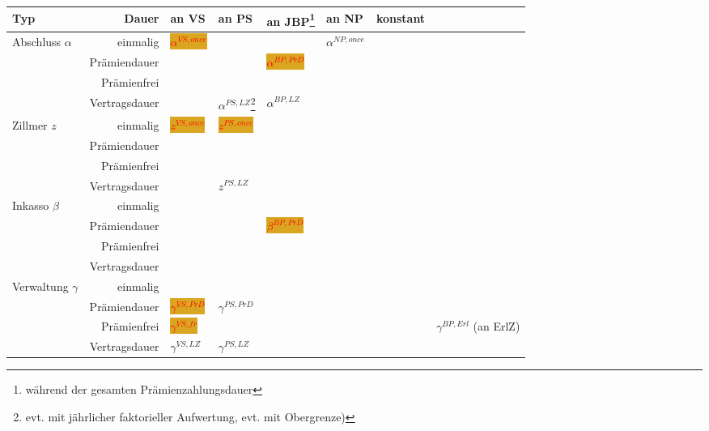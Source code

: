 \documentclass[a4paper,10pt]{article}
\newcommand{\markiert}[1]{{\setlength{\fboxsep}{0pt}\colorbox{Goldenrod}{\textcolor{red}{#1}}}}
\begin{document}
\begin{longtable}{||lr|v{1.5cm}|v{1.5cm}|v{1.5cm}|v{1.5cm}|v{1.5cm}|v{1.5cm}||}\hline\hline
Typ & Dauer & an VS & an PS & an JBP\footnote{während der gesamten Prämienzahlungsdauer} & an NP & konstant & \\ \hline


Abschluss $\alpha$ & einmalig      & \markiert{$\alpha^{VS,once}$} &                                                                                                    &                            & $\alpha^{NP,once}$ & & \\
                   & Prämiendauer  &                              &                                                                                                    & \markiert{$\alpha^{BP,PrD}$} & & & \\
                   & Prämienfrei   &                              &                                                                                                    &                            & & & \\
                   & Vertragsdauer &                              & $\alpha^{PS,LZ}$\footnote{evt. mit jährlicher faktorieller Aufwertung, evt. mit Obergrenze)} & $\alpha^{BP,LZ}$          & & & \\ \hline
Zillmer $z$ & einmalig      & \markiert{$z^{VS,once}$} & \markiert{$z^{PS,once}$} & & & & \\
            & Prämiendauer  &                         &                         & & & & \\
            & Prämienfrei   &                         &                         & & & & \\
            & Vertragsdauer &                         & $z^{PS,LZ}$ & & & & \\ \hline
Inkasso $\beta$ & einmalig      & & &                              & & & \\
                & Prämiendauer  & & & \markiert{$\beta^{BP,PrD}$} & & & \\
                & Prämienfrei   & & &                              & & & \\
                & Vertragsdauer & & &                              & & & \\ \hline
Verwaltung $\gamma$ & einmalig      &  & & & & & \\
                    & Prämiendauer  & \markiert{$\gamma^{VS,PrD}$}    & $\gamma^{PS,PrD}$ & & & & \\
                    & Prämienfrei   & \markiert{$\gamma^{VS,fr}$} &                   & & & & $\gamma^{BP,Erl}$ (an ErlZ) \\
                    & Vertragsdauer & $\gamma^{VS,LZ}$           & $\gamma^{PS,LZ}$ & &  & & \\\hline


\end{longtable}
\end{document}
